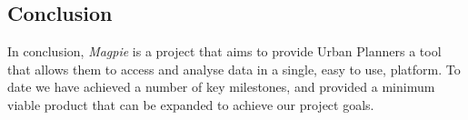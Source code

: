 \subsection{Conclusion}
In conclusion, \textit{Magpie} is a project that aims to provide Urban Planners
a tool that allows them to access and analyse data in a single, easy to use,
platform. To date we have achieved a number of key milestones, and provided a
minimum viable product that can be expanded to achieve our project goals.
\\ %
\\
\\
\\
\\
\\
\\

\pagebreak{}